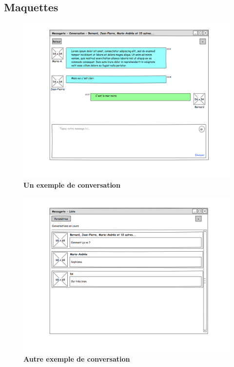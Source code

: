 \documentclass[11pt,dvipsnames,svgnames]{report}
\begin{document}
\subsection{Maquettes}
\begin{center}
\begin{figure}
\includegraphics[width=\textwidth]{maquette/maquette1.png}
\caption{\textbf{Un exemple de conversation}}
\end{figure}

\begin{figure}
\includegraphics[width=\textwidth]{maquette/maquette2.png}
\caption{\textbf{Autre exemple de conversation}}
\end{figure}


\end{center}
\end{document}
